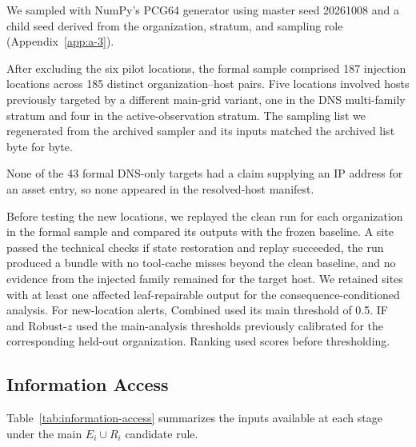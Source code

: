 \documentclass[sn-basic]{sn-jnl}%
\theoremstyle{thmstyleone}%
\theoremstyle{thmstyletwo}%
\theoremstyle{thmstylethree}%
\begin{document}
We sampled with NumPy's PCG64 generator using master seed 20261008 and a child seed derived from the organization, stratum, and sampling role (Appendix~\ref{app:a-3}).

After excluding the six pilot locations, the formal sample comprised 187 injection locations across 185 distinct organization--host pairs. Five locations involved hosts previously targeted by a different main-grid variant, one in the DNS multi-family stratum and four in the active-observation stratum. The sampling list we regenerated from the archived sampler and its inputs matched the archived list byte for byte.

None of the 43 formal DNS-only targets had a claim supplying an IP address for an asset entry, so none appeared in the resolved-host manifest.

Before testing the new locations, we replayed the clean run for each organization in the formal sample and compared its outputs with the frozen baseline. A site passed the technical checks if state restoration and replay succeeded, the run produced a bundle with no tool-cache misses beyond the clean baseline, and no evidence from the injected family remained for the target host. We retained sites with at least one affected leaf-repairable output for the consequence-conditioned analysis. For new-location alerts, Combined used its main threshold of 0.5. IF and Robust-\(z\) used the main-analysis thresholds previously calibrated for the corresponding held-out organization. Ranking used scores before thresholding.

\subsection{Information Access}\label{sec:information-access}

Table~\ref{tab:information-access} summarizes the inputs available at each stage under the main \(E_i\cup R_i\) candidate rule.
\end{document}
